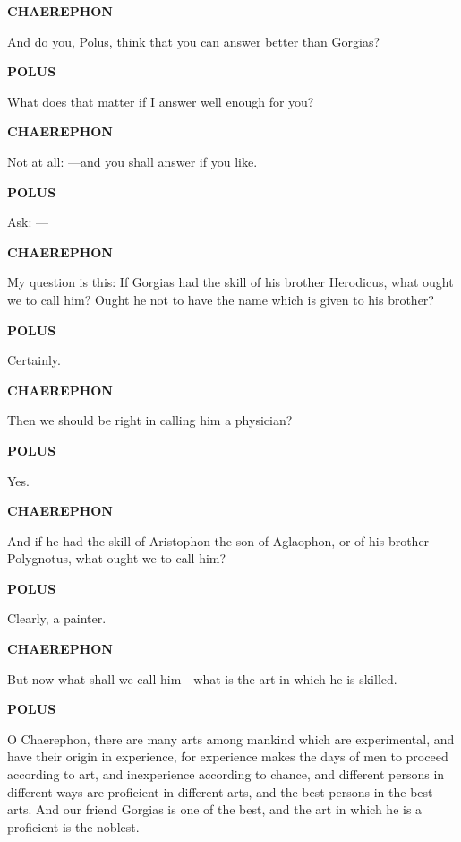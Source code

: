 \documentclass[11pt,letter]{article}
\begin{document}
\par \textbf{CHAEREPHON}
\par   And do you, Polus, think that you can answer better than Gorgias?

\par \textbf{POLUS}
\par   What does that matter if I answer well enough for you?

\par \textbf{CHAEREPHON}
\par   Not at all: —and you shall answer if you like.

\par \textbf{POLUS}
\par   Ask: —

\par \textbf{CHAEREPHON}
\par   My question is this:  If Gorgias had the skill of his brother Herodicus, what ought we to call him? Ought he not to have the name which is given to his brother?

\par \textbf{POLUS}
\par   Certainly.

\par \textbf{CHAEREPHON}
\par   Then we should be right in calling him a physician?

\par \textbf{POLUS}
\par   Yes.

\par \textbf{CHAEREPHON}
\par   And if he had the skill of Aristophon the son of Aglaophon, or of his brother Polygnotus, what ought we to call him?

\par \textbf{POLUS}
\par   Clearly, a painter.

\par \textbf{CHAEREPHON}
\par   But now what shall we call him—what is the art in which he is skilled.

\par \textbf{POLUS}
\par   O Chaerephon, there are many arts among mankind which are experimental, and have their origin in experience, for experience makes the days of men to proceed according to art, and inexperience according to chance, and different persons in different ways are proficient in different arts, and the best persons in the best arts. And our friend Gorgias is one of the best, and the art in which he is a proficient is the noblest.
\end{document}
